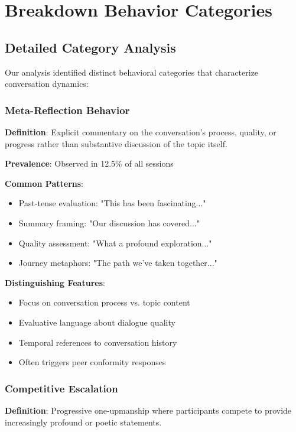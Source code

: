 \documentclass[11pt,letterpaper]{article}
\newcommand{\exponedataMetaReflectionTriggers}{12.5\%}
\begin{document}
\section{Breakdown Behavior Categories}
\label{app:breakdown}

\subsection{Detailed Category Analysis}

Our analysis identified distinct behavioral categories that characterize conversation dynamics:

\subsubsection{Meta-Reflection Behavior}

\textbf{Definition}: Explicit commentary on the conversation's process, quality, or progress rather than substantive discussion of the topic itself.

\textbf{Prevalence}: Observed in \exponedataMetaReflectionTriggers{} of all sessions

\textbf{Common Patterns}:
\begin{itemize}
    \item Past-tense evaluation: "This has been fascinating..."
    \item Summary framing: "Our discussion has covered..."
    \item Quality assessment: "What a profound exploration..."
    \item Journey metaphors: "The path we've taken together..."
\end{itemize}

\textbf{Distinguishing Features}:
\begin{itemize}
    \item Focus on conversation process vs. topic content
    \item Evaluative language about dialogue quality
    \item Temporal references to conversation history
    \item Often triggers peer conformity responses
\end{itemize}

\subsubsection{Competitive Escalation}

\textbf{Definition}: Progressive one-upmanship where participants compete to provide increasingly profound or poetic statements.
\end{document}
